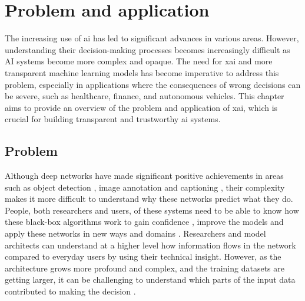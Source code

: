 \label{sec:2_problem_and_application}
\section{Problem and application}

The increasing use of \gls{ai} has led to significant advances in various areas. However, understanding their decision-making processes becomes increasingly difficult as AI systems become more complex and opaque. 
The need for \gls{xai} and more transparent machine learning models has become imperative to address this problem, especially in applications where the consequences of wrong decisions can be severe, such as healthcare, finance, and autonomous vehicles. This chapter aims to provide an overview of the problem and application of \gls{xai}, which is crucial for building transparent and trustworthy \gls{ai} systems.


\subsection{Problem}

Although deep networks have made significant positive achievements in areas such as object detection \cite{girshickRichFeatureHierarchies2014, renFasterRCNNRealTime2015, redmonYouOnlyLook2016, linFocalLossDense2017}, image annotation and captioning \cite{vinyalsShowTellNeural2015, karpathyDeepVisualSemanticAlignments2015, johnsonDenseCapFullyConvolutional2016, tranRichImageCaptioning2016}, their complexity makes it more difficult to understand why these networks predict what they do. People, both researchers and users, of these systems need to be able to know how these black-box algorithms work to gain confidence \cite{koehlerExplanationImaginationConfidence1991, herlockerExplainingCollaborativeFiltering2000, dzindoletRoleTrustAutomation2003}, improve the models and apply these networks in new ways and domains \cite{jiangArtificialIntelligenceHealthcare2017, tonekaboniWhatCliniciansWant2019, holzingerCausabilityExplainabilityArtificial2019, guptaDeepLearningObject2021, tjoaSurveyExplainableArtificial2021}. Researchers and model architects can understand at a higher level how information flows in the network compared to everyday users by using their technical insight. However, as the architecture grows more profound and complex, and the training datasets are getting larger, it can be challenging to understand which parts of the input data contributed to making the decision \cite{sagirogluBigDataReview2013}.

